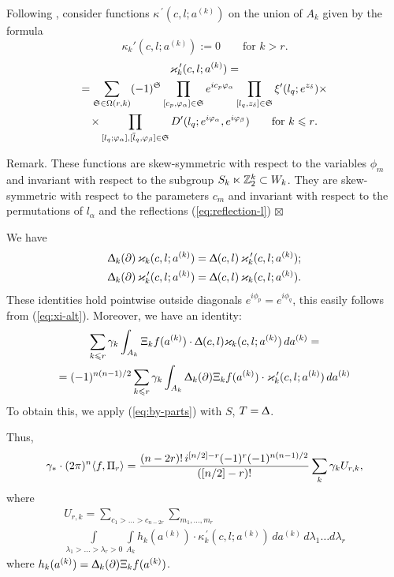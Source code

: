 \documentclass{article}
\def\sm{\smallskip}
\begin{document}
Following \cite{San}, consider  functions $\kappa^{\,\prime}(c,l;a^{(k)})$
on the union of $A_k$ given by the formula
\begin{equation}
\kappa_k'(c,l;a^{(k)}):=0 \qquad \text{for $k>r$}.
\label{eq:kappa-prime1}
\end{equation}
\begin{multline}
\varkappa_k^{\,\prime}(c,l;a^{(k)})=\\=
\sum_{\mathfrak S\in \Omega(r,k)}
(-1)^{\mathfrak S}
\prod_{[c_p,\varphi_\alpha]\in \mathfrak S} e^{i c_p\varphi_\alpha}
\prod_{[l_q,z_\delta]\in \mathfrak S}
\xi'(l_q; e^{z_\delta})
\times \\ \times
\prod_{[l_q;\varphi_\alpha], [\overline l_q,\varphi_\beta]\in\mathfrak S}
D'(l_q;e^{i\varphi_\alpha}, e^{i\varphi_\beta})
\qquad \text{for $k\leqslant r$}
\label{eq:kappa-prime2}
.\end{multline}


\sm

{\sc Remark.}
These functions are skew-symmetric with respect to the variables 
$\phi_m$ and invariant with respect to the subgroup 
$S_{k}\ltimes {\mathbb Z}_2^k\subset W_k$. They are skew-symmetric with respect to the
parameters $c_m$ and invariant with respect to the permutations of 
$l_\alpha$ and the reflections (\ref{eq:reflection-l})
\hfill $\boxtimes$

\sm
 
We have
\begin{align}
\Updelta_k(\partial) \,\varkappa_k(c,l;a^{(k)})=\Updelta(c,l) \,\varkappa_k^{\,\prime}(c,l;a^{(k)});
\\
\Updelta_k(\partial)\, \varkappa_k^{\,\prime}(c,l;a^{(k)})=\Updelta(c,l)\, \varkappa_k(c,l;a^{(k)}).
\end{align}
These identities hold pointwise outside diagonals 
$e^{i\phi_p}=e^{i\phi_q}$, this easily follows from (\ref{eq:xi-alt}).
Moreover, we have an identity:
\begin{multline*}
\sum_{k\leqslant r} \gamma_k \int_{A_k}\Xi_k f(a^{(k)}) \cdot \Updelta(c,l)  \varkappa_k (c,l;a^{(k)})\, da^{(k)}=
\\=
(-1)^{n(n-1)/2}
\sum_{k\leqslant r} \gamma_k  \int_{A_k}\Updelta_k(\partial)\Xi_k f(a^{(k)}) \cdot
\varkappa^{\,\prime}_k (c,l;a^{(k)})\, da^{(k)}
\end{multline*}
To obtain this, we apply (\ref{eq:by-parts}) with $S$, $T=\Updelta$.

Thus, 
$$
\gamma_*\cdot(2\pi)^n\langle f,\Pi_r\rangle=
\frac{(n-2r)!\, i^{[n/2]-r} (-1)^r(-1)^{n(n-1)/2}}{([n/2]-r)!}
\sum_{k}\gamma_k U_{r,k}
,$$
where 
\begin{multline}
U_{r,k}=
\sum_{c_1>\dots>c_{n-2r}}
\sum_{m_1,\dots,m_r}
\\
\int\limits_{\lambda_1>\dots>\lambda_r>0}
\int\limits_{A_k} h_k(a^{(k)}) \cdot \kappa^{\,\prime}_k(c,l;a^{(k)})\,d a^{(k)}
\,d\lambda_1\dots d\lambda_r
\label{eq:U-k}
\end{multline}
where $h_k(a^{(k)})=\Updelta_k(\partial)\Xi_k f(a^{(k)})$. 
\end{document}
